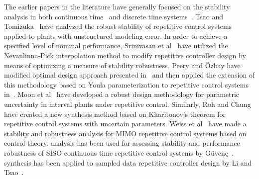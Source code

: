 \documentclass[12pt,draftcls,onecolumn]{IEEEtran}
\begin{document}
The earlier papers in the literature have generally focused on the stability analysis in both continuous time~\cite{HYO+:88, SrS:91} and discrete time systems~\cite{TTC:89}. Tsao and Tomizuka~\cite{TsT:94} have analyzed the robust stability of repetitive control systems applied to plants with unstructured modeling error. In order to achieve a specified level of nominal performance, Srinivasan et al~\cite{SOJ:95} have utilized the
Nevanlinna-Pick interpolation method to modify repetitive controller design by means of optimizing a measure of stability
robustness. Peery and \"Ozbay have modified optimal design approach presented in~\cite{Ozb:93} and then applied the extension of this methodology based on Youla parameterization to repetitive control systems in~\cite{PeO:97}. Moon et al~\cite{MLC:98} have developed a robust design methodology for parametric uncertainty in interval plants under repetitive control. Similarly, Roh and Chung~\cite{RoC:95} have created a new synthesis method based on Kharitonov's theorem for repetitive control systems with uncertain parameters. Weiss et al~\cite{WeH:99, WZG+:04, ZLW+:06} have made a stability and robustness analysis for MIMO
repetitive control systems based on  control theory.  analysis has been used for assessing stability and performance robustness of SISO continuous time repetitive control systems by G\"uven\c{c}~\cite{Guv:96}.  synthesis has been applied to sampled data repetitive controller design by Li and Tsao~\cite{LiT:98}.
\end{document}
